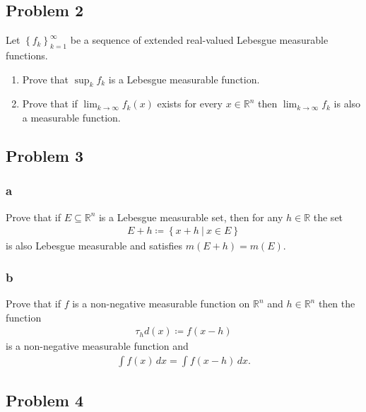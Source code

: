 \hypertarget{problem-2}{%
\subsection{Problem 2}\label{problem-2}}

Let \(\left\{{ f_k }\right\} _{k=1}^{\infty }\) be a sequence of
extended real-valued Lebesgue measurable functions.

\begin{enumerate}
\def\labelenumi{\alph{enumi}.}
\item
  Prove that \(\sup_k f_k\) is a Lebesgue measurable function.
\item
  Prove that if \(\lim_{k \to \infty } f_k(x)\) exists for every
  \(x \in {\mathbb{R}}^n\) then \(\lim_{k\to \infty } f_k\) is also a
  measurable function.
\end{enumerate}

\hypertarget{problem-3}{%
\subsection{Problem 3}\label{problem-3}}

\hypertarget{a-4}{%
\subsubsection{a}\label{a-4}}

Prove that if \(E \subseteq {\mathbb{R}}^n\) is a Lebesgue measurable
set, then for any \(h \in {\mathbb{R}}\) the set
\begin{align*}
E+h \coloneqq\left\{{x + h {~\mathrel{\Big|}~}x\in E }\right\}
\end{align*}
is also Lebesgue measurable and satisfies \(m(E + h) = m(E)\).

\hypertarget{b-3}{%
\subsubsection{b}\label{b-3}}

Prove that if \(f\) is a non-negative measurable function on
\({\mathbb{R}}^n\) and \(h\in {\mathbb{R}}^n\) then the function
\begin{align*}
\tau_h d(x) \coloneqq f(x-h)
\end{align*}
is a non-negative measurable function and
\begin{align*}
\int f(x) \,dx= \int f(x-h) \,dx
.\end{align*}

\hypertarget{problem-4}{%
\subsection{Problem 4}\label{problem-4}}

